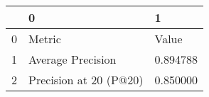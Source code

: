 \begin{tabular}{lll}
\toprule
 & 0 & 1 \\
\midrule
0 & Metric & Value \\
1 & Average Precision & 0.894788 \\
2 & Precision at 20 (P@20) & 0.850000 \\
\bottomrule
\end{tabular}
